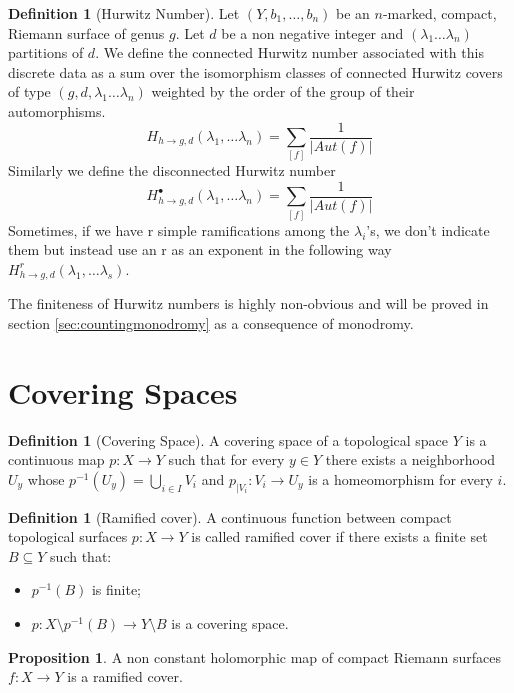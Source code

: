 \documentclass[12pt,a4paper,openright,twoside]{report}
\theoremstyle{definition} %
\newtheorem{proposition}[theorem]{Proposition}
\newtheorem{definition}[theorem]{Definition}
\begin{document}
\begin{definition}[Hurwitz Number]
    Let \((Y, b_1, \ldots, b_n)\) be an \(n\)-marked, compact, Riemann surface of genus \(g\). Let \(d\) be a non negative integer and \( (\lambda_1 \ldots \lambda_n)\) partitions of \(d\). We define the connected Hurwitz number associated with this discrete data as a sum over the isomorphism classes of connected Hurwitz covers of type \((g,d,\lambda_1 \ldots \lambda_n)\) weighted by the order of the group of their automorphisms.
    \[
    H_{h \to g,d}(\lambda_1, \ldots \lambda_n) = \sum_{[f]} \frac{1}{|Aut(f)|}
    \]
    Similarly we define the disconnected Hurwitz number
    \[
    H_{h \to g,d}^{\bullet}(\lambda_1, \ldots \lambda_n) = \sum_{[f]} \frac{1}{|Aut(f)|}
    \]
    Sometimes, if we have r simple ramifications among the \(\lambda_i\)'s, we don't indicate them but instead use an r as an exponent in the following way \(H^r_{h \to g,d}(\lambda_1, \ldots \lambda_s)\).
\end{definition}

The finiteness of Hurwitz numbers is highly non-obvious and will be proved in section \ref{sec:countingmonodromy} as a consequence of monodromy.

\section{Covering Spaces}

\begin{definition}[Covering Space]
    A covering space of a topological space \(Y\) is a continuous map \(p: X \to Y\) such that for every \(y \in Y\) there exists a neighborhood \(U_y\) whose \(p^{-1}(U_y) = \bigcup_{i \in I} V_i\) and \(p_{|V_i}:V_i \rightarrow U_y\) is a homeomorphism for every \(i\).
\end{definition}

\begin{definition}[Ramified cover]
    A continuous function between compact topological surfaces \( p : X \to Y\) is called ramified cover if there exists a finite set \(B \subseteq Y\) such that:
    \begin{itemize}
        \item \(p^{-1}(B)\) is finite;
        \item \(p : X \setminus p^{-1}(B) \to Y \setminus B\) is a covering space.
    \end{itemize}
\end{definition}

\begin{proposition}
    A non constant holomorphic map of compact Riemann surfaces \(f : X \to Y\) is a ramified cover.
\end{proposition}
\end{document}
